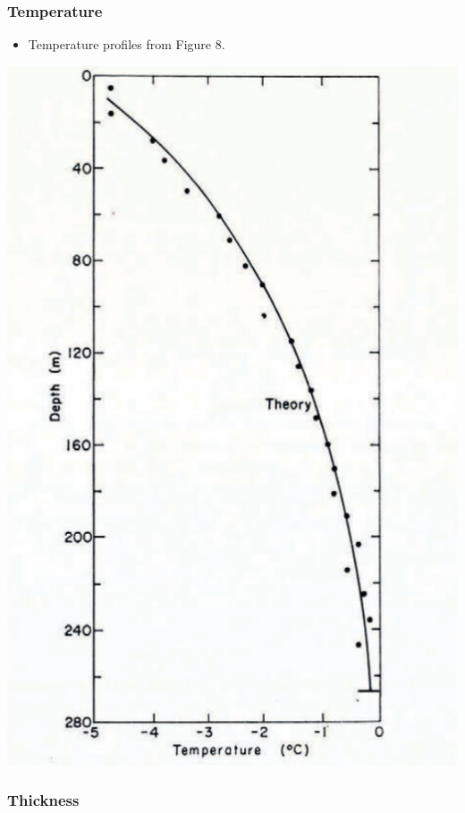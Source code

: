 \documentclass[article,a4paper,times,11pt,twoside]{article}
\begin{document}
\subsubsection{Temperature}
\label{sec:org45b9687}

\begin{itemize}
\item Temperature profiles from \textcite{colbeck_1979} Figure 8.
\end{itemize}

\begin{center}
\includegraphics[width=.9\linewidth]{isua_13/isua_13.png}
\end{center}

\subsubsection{Thickness}
\label{sec:org0cb2540}
\end{document}
